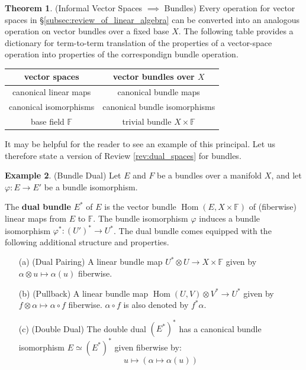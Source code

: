 \documentclass[12pt]{article}
\theoremstyle{definition}
\newtheorem{theorem}{Theorem}[section]
\newtheorem{example}[theorem]{Example}
\numberwithin{equation}{section}
\newcommand{\op}{\operatorname}
\begin{document}
\begin{theorem} \label{thm:informal_bundles} (Informal Vector Spaces $\implies$ Bundles) Every operation for vector spaces in \S \ref{subsec:review_of_linear_algebra} can be converted into an analogous operation on vector bundles over a fixed base $X$. The following table provides a dictionary for term-to-term translation of the properties of a vector-space operation into properties of the correspondign bundle operation.
\end{theorem} 

\begin{center}
\begin{tabular}{c|c}
vector spaces & vector bundles over $X$\\
\hline 
canonical linear maps & canonical bundle maps\\
\hline
canonical isomorphisms & canonical bundle isomorphisms\\
\hline
base field $\mathbb{F}$ & trivial bundle $X \times \mathbb{F}$\\
\end{tabular}
\end{center}

It may be helpful for the reader to see an example of this principal. Let us therefore state a version of Review \ref{rev:dual_spaces} for bundles. 

\begin{example} \label{ex:bundle_dual} (Bundle Dual) Let $E$ and $F$ be a bundles over a manifold $X$, and let $\varphi:E \to E'$ be a bundle isomorphism.

The {\bf dual bundle} $E^*$ of $E$ is the vector bundle $\op{Hom}(E,X \times \mathbb{F})$ of (fiberwise) linear maps from $E$ to $\mathbb{F}$. The bundle isomorphism $\varphi$ induces a bundle isomorphism $\varphi^*:(U')^* \to U^*$. The dual bundle comes equipped with the following additional structure and properties.
\begin{enumerate} 
	\item[(a)] (Dual Pairing) A linear bundle map $U^* \otimes U \to X \times \mathbb{F}$ given by $\alpha \otimes u \mapsto \alpha(u)$ fiberwise.
	\item[(b)] (Pullback) A linear bundle map $\op{Hom}(U,V) \otimes V^* \to U^*$ given by $f \otimes \alpha \mapsto \alpha \circ f$ fiberwise. $\alpha \circ f$ is also denoted by $f^*\alpha$.
	\item[(c)] (Double Dual) The double dual $(E^*)^*$ has a canonical bundle isomorphism $E \simeq (E^*)^*$ given fiberwise by:
	\[u \mapsto (\alpha \mapsto \alpha(u))\]
\end{enumerate}
\end{example}
\end{document}
